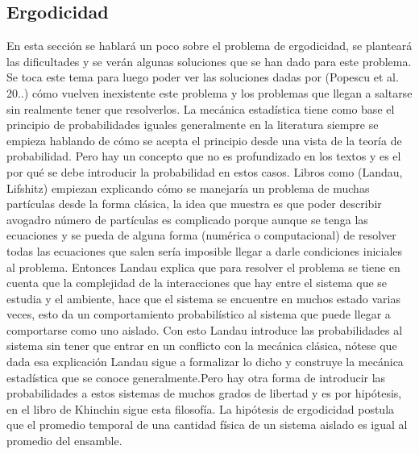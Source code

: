 \subsection{Ergodicidad}
En esta sección se hablará un poco sobre el problema de ergodicidad, se planteará las dificultades y se verán algunas soluciones que se han dado para este problema. Se toca este tema para luego poder ver las soluciones dadas por (Popescu et al. 20..) cómo vuelven inexistente este problema y los problemas que llegan a saltarse sin realmente tener que resolverlos.
La mecánica estadística tiene como base el principio de probabilidades iguales generalmente en la literatura siempre se empieza hablando de cómo se acepta el principio desde una vista de la teoría de probabilidad. Pero hay un concepto que no es profundizado en los textos y es el por qué se debe introducir la probabilidad en estos casos. Libros como (Landau, Lifshitz) empiezan explicando cómo se manejaría un problema de muchas partículas desde la forma clásica, la idea que muestra es que poder describir avogadro número de partículas es complicado porque aunque se  tenga las ecuaciones y se pueda de alguna forma (numérica o computacional) de resolver todas las ecuaciones que salen sería imposible llegar a darle condiciones iniciales al problema. Entonces Landau explica que para resolver el problema se tiene en cuenta que la complejidad de la interacciones que hay entre el sistema que se estudia y el ambiente, hace que el sistema se encuentre en muchos estado varias veces, esto da un comportamiento probabilístico al sistema que puede llegar a comportarse como uno aislado.
Con esto Landau introduce las probabilidades al sistema sin tener que entrar en un conflicto con la mecánica clásica, nótese que dada esa explicación Landau sigue a formalizar lo dicho y construye la mecánica estadística que se conoce generalmente.Pero hay otra forma de introducir las probabilidades a estos sistemas de muchos grados de libertad y es por hipótesis, en el libro de Khinchin sigue esta filosofía.
La hipótesis de ergodicidad postula que el promedio temporal de una cantidad física de un sistema aislado es igual al promedio del ensamble.\\

